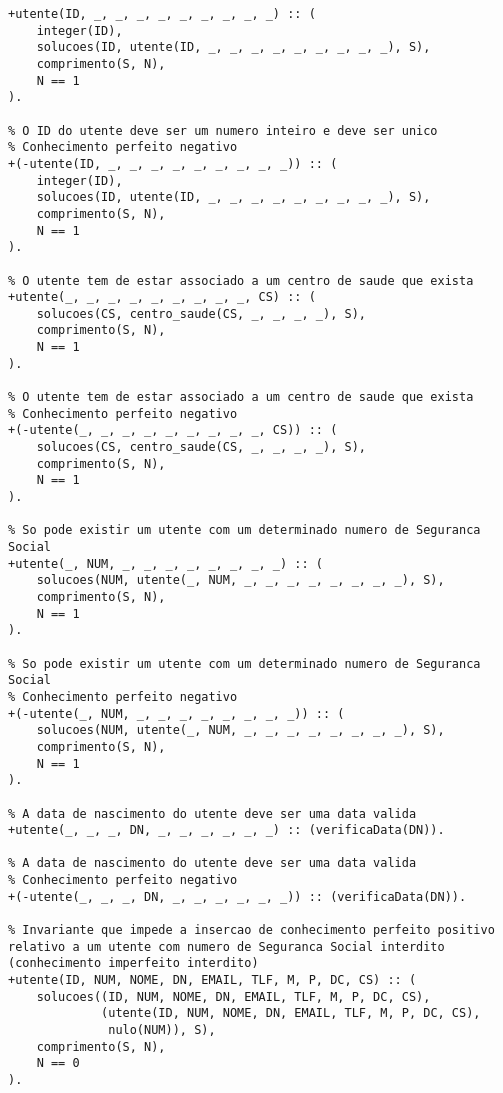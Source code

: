 \begin{lstlisting}[caption={Invariantes de inserção relativos ao predicado \texttt{utente}}]
% O ID do utente deve ser um numero inteiro e deve ser unico
+utente(ID, _, _, _, _, _, _, _, _, _) :: (
    integer(ID),
    solucoes(ID, utente(ID, _, _, _, _, _, _, _, _, _), S),
    comprimento(S, N),
    N == 1
).

% O ID do utente deve ser um numero inteiro e deve ser unico
% Conhecimento perfeito negativo
+(-utente(ID, _, _, _, _, _, _, _, _, _)) :: (
    integer(ID),
    solucoes(ID, utente(ID, _, _, _, _, _, _, _, _, _), S),
    comprimento(S, N),
    N == 1
).

% O utente tem de estar associado a um centro de saude que exista
+utente(_, _, _, _, _, _, _, _, _, CS) :: (
    solucoes(CS, centro_saude(CS, _, _, _, _), S),
    comprimento(S, N),
    N == 1
).

% O utente tem de estar associado a um centro de saude que exista
% Conhecimento perfeito negativo
+(-utente(_, _, _, _, _, _, _, _, _, CS)) :: (
    solucoes(CS, centro_saude(CS, _, _, _, _), S),
    comprimento(S, N),
    N == 1
).

% So pode existir um utente com um determinado numero de Seguranca Social
+utente(_, NUM, _, _, _, _, _, _, _, _) :: (
    solucoes(NUM, utente(_, NUM, _, _, _, _, _, _, _, _), S),
    comprimento(S, N),
    N == 1
).

% So pode existir um utente com um determinado numero de Seguranca Social
% Conhecimento perfeito negativo
+(-utente(_, NUM, _, _, _, _, _, _, _, _)) :: (
    solucoes(NUM, utente(_, NUM, _, _, _, _, _, _, _, _), S),
    comprimento(S, N),
    N == 1
).

% A data de nascimento do utente deve ser uma data valida
+utente(_, _, _, DN, _, _, _, _, _, _) :: (verificaData(DN)).

% A data de nascimento do utente deve ser uma data valida
% Conhecimento perfeito negativo
+(-utente(_, _, _, DN, _, _, _, _, _, _)) :: (verificaData(DN)).

% Invariante que impede a insercao de conhecimento perfeito positivo relativo a um utente com numero de Seguranca Social interdito (conhecimento imperfeito interdito)
+utente(ID, NUM, NOME, DN, EMAIL, TLF, M, P, DC, CS) :: (
    solucoes((ID, NUM, NOME, DN, EMAIL, TLF, M, P, DC, CS),
             (utente(ID, NUM, NOME, DN, EMAIL, TLF, M, P, DC, CS),
              nulo(NUM)), S),
    comprimento(S, N),
    N == 0
).

\end{lstlisting}


